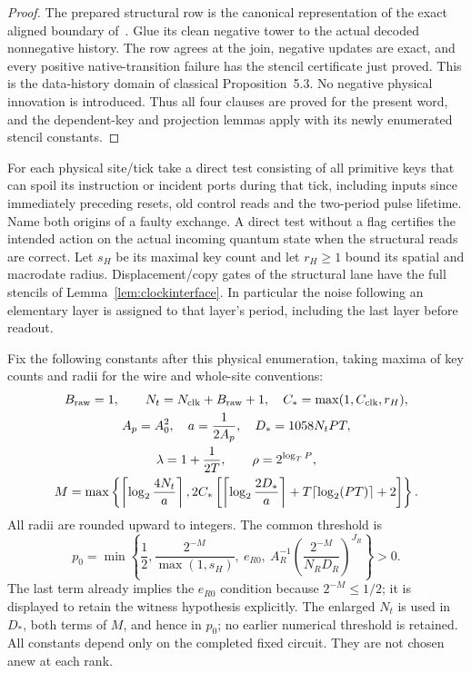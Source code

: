 \begin{proof}
The prepared structural row is the canonical representation of the exact aligned boundary of~\cite[Lemma~6.4]{DMNoise1D2026}. Glue its clean negative tower to the actual decoded nonnegative history. The row agrees at the join, negative updates are exact, and every positive native-transition failure has the stencil certificate just proved. This is the data-history domain of classical Proposition~5.3. No negative physical innovation is introduced. Thus all four clauses are proved for the present word, and the dependent-key and projection lemmas apply with its newly enumerated stencil constants.
\end{proof}

For each physical site/tick take a direct test consisting of all primitive keys that can spoil its instruction or incident ports during that tick, including inputs since immediately preceding resets, old control reads and the two-period pulse lifetime. Name both origins of a faulty exchange. A direct test without a flag certifies the intended action on the actual incoming quantum state when the structural reads are correct. Let $s_H$ be its maximal key count and let $r_H\ge1$ bound its spatial and macrodate radius. Displacement/copy gates of the structural lane have the full stencils of Lemma~\ref{lem:clockinterface}. In particular the noise following an elementary layer is assigned to that layer's period, including the last layer before readout.

Fix the following constants after this physical enumeration, taking maxima of key counts and radii for the wire and whole-site conventions:
\begin{equation}\label{eq:probconstants}
\begin{gathered}
 B_{\rm raw}=1,\qquad N_t=N_{\rm clk}+B_{\rm raw}+1,\quad C_* =\max(1,C_{\rm clk},r_H),\\
 A_p=A_0^2,\quad a=\frac1{2A_p},\quad D_*=1058N_tPT,\\
 \lambda=1+\frac1{2T},\qquad \rho=2^{\log_T P},\\
 M=\max\left\{\left\lceil\log_2\frac{4N_t}{a}\right\rceil,
 2C_*\left[\left\lceil\log_2\frac{2D_*}{a}\right\rceil
 +T\lceil\log_2(PT)\rceil+2\right]\right\}.
\end{gathered}
\end{equation}
All radii are rounded upward to integers. The common threshold is
\begin{equation}\label{eq:threshold}
 p_0=\min\left\{\frac12,\frac{2^{-M}}{\max(1,s_H)},\ e_{R0},\
 A_R^{-1}\left(\frac{2^{-M}}{N_RD_R}\right)^{J_R}\right\}>0.
\end{equation}
The last term already implies the $e_{R0}$ condition because $2^{-M}\le1/2$; it is displayed to retain the witness hypothesis explicitly. The enlarged $N_t$ is used in $D_*$, both terms of $M$, and hence in $p_0$; no earlier numerical threshold is retained. All constants depend only on the completed fixed circuit. They are not chosen anew at each rank.

